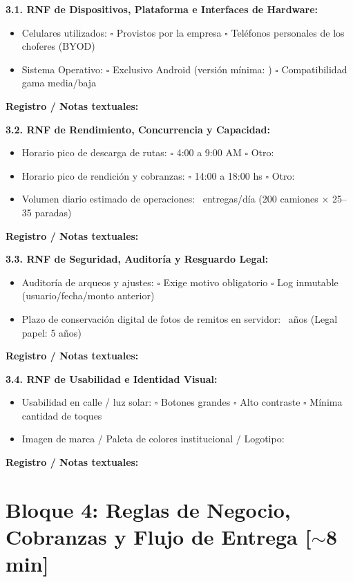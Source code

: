 \documentclass[10pt,a4paper]{article}
\newcommand{\espacioNotas}[1]{%
  \vspace{2pt}%
  \noindent\textbf{\footnotesize Registro / Notas textuales:}\par
  \noindent\fbox{%
    \parbox{\dimexpr\textwidth-2\fboxsep-2\fboxrule\relax}{%
      \vspace{#1pt}%
    }%
  }%
  \vspace{3pt}%
}
\begin{document}
\noindent
\textbf{3.1. RNF de Dispositivos, Plataforma e Interfaces de Hardware:}
\begin{itemize}
  \item Celulares utilizados: \quad $\square$ Provistos por la empresa \quad $\square$ Teléfonos personales de los choferes (BYOD)
  \item Sistema Operativo: \quad $\square$ Exclusivo Android (versión mínima: \hrulefill) \quad $\square$ Compatibilidad gama media/baja
\end{itemize}
\espacioNotas{26}

\noindent
\textbf{3.2. RNF de Rendimiento, Concurrencia y Capacidad:}
\begin{itemize}
  \item Horario pico de descarga de rutas: \quad $\square$ 4:00 a 9:00 AM \quad $\square$ Otro: \hrulefill
  \item Horario pico de rendición y cobranzas: \quad $\square$ 14:00 a 18:00 hs \quad $\square$ Otro: \hrulefill
  \item Volumen diario estimado de operaciones: \hrulefill \ entregas/día (200 camiones $\times$ 25--35 paradas)
\end{itemize}
\espacioNotas{26}

\noindent
\textbf{3.3. RNF de Seguridad, Auditoría y Resguardo Legal:}
\begin{itemize}
  \item Auditoría de arqueos y ajustes: \quad $\square$ Exige motivo obligatorio \quad $\square$ Log inmutable (usuario/fecha/monto anterior)
  \item Plazo de conservación digital de fotos de remitos en servidor: \hrulefill \ años (Legal papel: 5 años)
\end{itemize}
\espacioNotas{26}

\noindent
\textbf{3.4. RNF de Usabilidad e Identidad Visual:}
\begin{itemize}
  \item Usabilidad en calle / luz solar: \quad $\square$ Botones grandes \quad $\square$ Alto contraste \quad $\square$ Mínima cantidad de toques
  \item Imagen de marca / Paleta de colores institucional / Logotipo: \hrulefill
\end{itemize}
\espacioNotas{26}

\section*{Bloque 4: Reglas de Negocio, Cobranzas y Flujo de Entrega [$\sim$8 min]}
\end{document}
